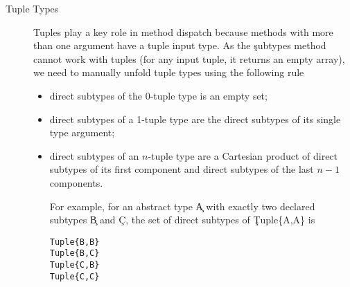 \begin{description}
  \item[Tuple Types]
        Tuples play a key role in method dispatch because methods with
        more than one argument have a tuple input type. As the \c{subtypes} method
        cannot work with tuples (for any input tuple, it returns an empty
        array), we need to manually unfold tuple types using the following rule
        \begin{itemize}
          \item direct subtypes of the 0-tuple type is an empty set;
          \item direct subtypes of a 1-tuple type are the direct subtypes of its
          single type argument;
          \item direct subtypes of an $n$-tuple type are a Cartesian product of
          direct subtypes of its first component and direct subtypes of the last
          $n-1$ components.

          For example, for an abstract type \c{A} with exactly two declared
          subtypes \c{B} and \c{C}, the set of direct subtypes of
          \c{Tuple\{A,A\}} is

\begin{minipage}{.9\textwidth}
        \begin{lstlisting}
Tuple{B,B}
Tuple{B,C}
Tuple{C,B}
Tuple{C,C}
        \end{lstlisting}
\end{minipage}

        \end{itemize}


\end{description}

